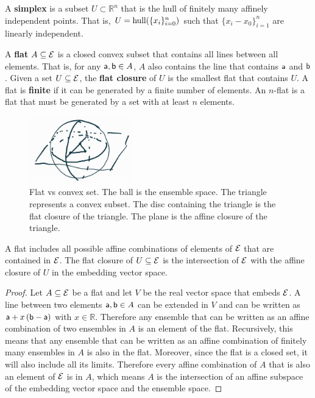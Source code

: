 \begin{mathSection}
\begin{defn}
	A \textbf{simplex} is a subset $U \subset \mathbb{R}^n$ that is the hull of finitely many affinely independent points. That is, $U = \hull(\{x_i\}_{i=0}^{n})$ such that $\{x_i - x_0\}_{i=1}^{n}$ are linearly independent.
\end{defn}

\begin{defn}
	A \textbf{flat} $A \subseteq \Ens$ is a closed convex subset that contains all lines between all elements. That is, for any $\ens[a], \ens[b] \in A$, $A$ also contains the line that contains $\ens[a]$ and $\ens[b]$. Given a set $U \subseteq \Ens$, the \textbf{flat closure} of $U$ is the smallest flat that contains $U$. A flat is \textbf{finite} if it can be generated by a finite number of elements. An $n$-flat is a flat that must be generated by a set with at least $n$ elements.
\end{defn}

\begin{figure}[H]
	\centering
	\includegraphics[width=0.4\textwidth]{tempimages/FlatVsConvex.jpg}
	\caption{Flat vs convex set. The ball is the ensemble space. The triangle represents a convex subset. The disc containing the triangle is the flat closure of the triangle. The plane is the affine closure of the triangle.}
\end{figure}


\begin{prop}
	A flat includes all possible affine combinations of elements of $\Ens$ that are contained in $\Ens$. The flat closure of $U \subseteq \Ens$ is the intersection of $\Ens$ with the affine closure of $U$ in the embedding vector space.
\end{prop}

\begin{proof}
	Let $A \subseteq \Ens$ be a flat and let $V$ be the real vector space that embeds $\Ens$. A line between two elements $\ens[a], \ens[b] \in A$ can be extended in $V$ and can be written as $\ens[a] + x \left(\ens[b] - \ens[a]\right)$ with $x \in \mathbb{R}$. Therefore any ensemble that can be written as an affine combination of two ensembles in $A$ is an element of the flat. Recursively, this means that any ensemble that can be written as an affine combination of finitely many ensembles in $A$ is also in the flat. Moreover, since the flat is a closed set, it will also include all its limits. Therefore every affine combination of $A$ that is also an element of $\Ens$ is in $A$, which means $A$ is the intersection of an affine subspace of the embedding vector space and the ensemble space.
	

\end{proof}
\end{mathSection}

